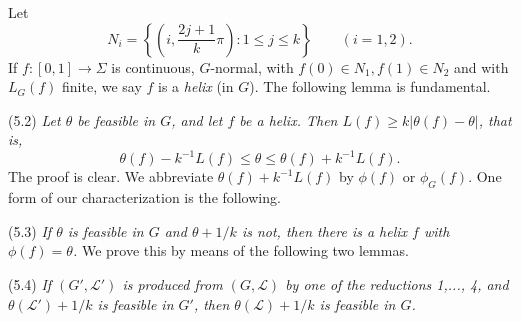 Let
\begin{equation*}
N_i = \left\{\left(i, \frac{2j+1}{k}\pi\right): 1 \le j \le k\right\} \qquad (i = 1, 2).
\end{equation*}
If $f: [0, 1] \to \Sigma$ is continuous, $G$-normal, with $f(0) \in N_1, f(1) \in N_2$ and with $L_G(f)$ finite, we say $f$ is a \textit{helix} (in $G$). The following lemma is fundamental.

\stmt
(5.2) \textit{Let $\theta$ be feasible in $G$, and let $f$ be a helix. Then $L(f) \ge k|\theta(f) - \theta|$, that is,}
\begin{equation*}
\theta(f) - k^{-1}L(f) \le \theta \le \theta(f) + k^{-1}L(f).
\end{equation*}
The proof is clear. We abbreviate $\theta(f) + k^{-1}L(f)$ by $\phi(f)$ or $\phi_G(f)$. One form of our characterization is the following.

\stmt
(5.3) \textit{If $\theta$ is feasible in $G$ and $\theta + 1/k$ is not, then there is a helix $f$ with $\phi(f) = \theta$.} We prove this by means of the following two lemmas.

\stmt
(5.4) \textit{If $(G', \mathcal{L}')$ is produced from $(G, \mathcal{L})$ by one of the reductions 1,..., 4, and $\theta(\mathcal{L}') + 1/k$ is feasible in $G'$, then $\theta(\mathcal{L}) + 1/k$ is feasible in $G$.}

